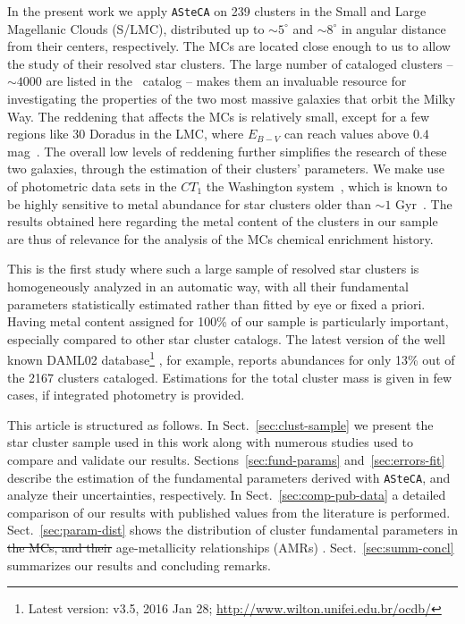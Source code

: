 \documentclass[draft]{aa}
\providecommand{\DIFaddtex}[1]{{\protect\color{blue}\uwave{#1}}} %
\providecommand{\DIFdeltex}[1]{{\protect\color{red}\sout{#1}}}                      %
\providecommand{\DIFaddbegin}{} %
\providecommand{\DIFaddend}{} %
\providecommand{\DIFdelbegin}{} %
\providecommand{\DIFdelend}{} %
\providecommand{\DIFadd}[1]{\texorpdfstring{\DIFaddtex{#1}}{#1}} %
\providecommand{\DIFdel}[1]{\texorpdfstring{\DIFdeltex{#1}}{}} %
\begin{document}
In the present work we apply \texttt{ASteCA} on 239 clusters in the Small and
Large Magellanic Clouds (S/LMC), distributed up to ${\sim}5^{\circ}$ and $
{\sim}8^{\circ}$ in angular distance from their centers, respectively.
%
The MCs are located close enough to us to allow the study of their resolved star
clusters. The large number of cataloged clusters -- $\sim4000$ are listed in
the~\cite{Bica_2008} catalog -- makes them an invaluable resource for
investigating the properties of the two most massive galaxies that orbit the
Milky Way.
%
The reddening that affects the MCs is relatively small, except for a few regions
like 30 Doradus in the LMC, where $E_{B-V}$ can reach values above $0.4$
mag~\citep{Piatti_2015b}. The overall low levels of reddening further simplifies
the research of these two galaxies, through the estimation of their clusters'
parameters.
%
We make use of photometric data sets in the $CT_1$ the Washington
system~\citep{Canterna_1976,Geisler_1996}, which is known to be highly sensitive
to metal abundance for star clusters older than ${\sim}1$
Gyr~\citep{Geisler_1999}.
The results obtained here regarding the metal content of the clusters in our
sample are thus of relevance for the analysis of the MCs chemical
enrichment history.

This is the first study where such a large sample of resolved star clusters is
homogeneously analyzed in an automatic way, with all their fundamental
parameters statistically estimated rather than fitted by eye or fixed a priori.
%
Having metal content assigned for 100\% of our sample is particularly
important, especially compared to other star cluster catalogs. The latest
version of the well known DAML02 database\footnote{Latest version: v3.5, 2016
Jan 28; \url{http://www.wilton.unifei.edu.br/ocdb/}}
\citep{Dias_2002}, for example, reports abundances for only 13\% out of the 2167
clusters cataloged. Estimations for the total cluster mass is given in few
cases, if integrated photometry is provided.

This article is structured as follows.
In Sect.~\ref{sec:clust-sample} we present the star cluster sample used in
this work along with numerous studies used to compare and validate our
results.
Sections~\ref{sec:fund-params} and~\ref{sec:errors-fit} describe the estimation
of the fundamental parameters derived with \texttt{ASteCA}, and analyze their
uncertainties, respectively.
In Sect.~\ref{sec:comp-pub-data} a detailed comparison of our results with
published values from the literature is performed.
Sect.~\ref{sec:param-dist} shows the distribution of cluster fundamental
parameters in \DIFdelbegin \DIFdel{the MCs, and their }\DIFdelend \DIFaddbegin \DIFadd{our catalog, and the }\DIFaddend age-metallicity relationships (AMRs) \DIFaddbegin \DIFadd{for the
cluster system}\DIFaddend .
Sect.~\ref{sec:summ-concl} summarizes our results and concluding remarks.
\end{document}

